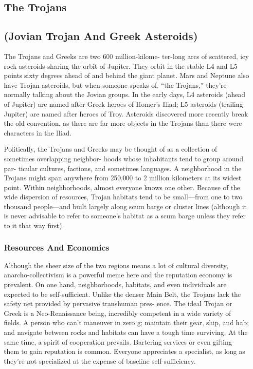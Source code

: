 \subsection{The Trojans}


\subsection{(Jovian Trojan And Greek Asteroids)}

The Trojans and Greeks are two 600 million-kilome-
ter-long arcs of scattered, icy rock asteroids sharing 
the orbit of Jupiter. They orbit in the stable L4 and 
L5 points sixty degrees ahead of and behind the giant 
planet. Mars and Neptune also have Trojan asteroids, 
but when someone speaks of, ``the Trojans,'' they're 
normally talking about the Jovian groups. In the early 
days, L4 asteroids (ahead of Jupiter) are named after 
Greek heroes of Homer's Iliad; L5 asteroids (trailing 
Jupiter) are named after heroes of Troy. Asteroids 
discovered more recently break the old convention, as 
there are far more objects in the Trojans than there 
were characters in the Iliad.

Politically, the Trojans and Greeks may be thought 
of as a collection of sometimes overlapping neighbor-
hoods whose inhabitants tend to group around par-
ticular cultures, factions, and sometimes languages. 
A neighborhood in the Trojans might span anywhere 
from 250,000 to 2 million kilometers at its widest 
point. Within neighborhoods, almost everyone knows 
one other. Because of the wide dispersion of resources, 
Trojan habitats tend to be small—from one to two 
thousand people—and built largely along scum barge 
or cluster lines (although it is never advisable to refer 
to someone's habitat as a scum barge unless they refer 
to it that way first).

\subsubsection{Resources And Economics}

Although the sheer size of the two regions means 
a lot of cultural diversity, anarcho-collectivism is a 
powerful meme here and the reputation economy is 
prevalent. On one hand, neighborhoods, habitats, 
and even individuals are expected to be self-sufficient. 
Unlike the denser Main Belt, the Trojans lack the 
safety net provided by pervasive transhuman pres-
ence. The ideal Trojan or Greek is a Neo-Renaissance 
being, incredibly competent in a wide variety of fields. 
A person who can't maneuver in zero g; maintain 
their gear, ship, and hab; and navigate between rocks 
and habitats can have a tough time surviving. At the 
same time, a spirit of cooperation prevails. Bartering 
services or even gifting them to gain reputation is 
common. Everyone appreciates a specialist, as long 
as they're not specialized at the expense of baseline 
self-sufficiency.


